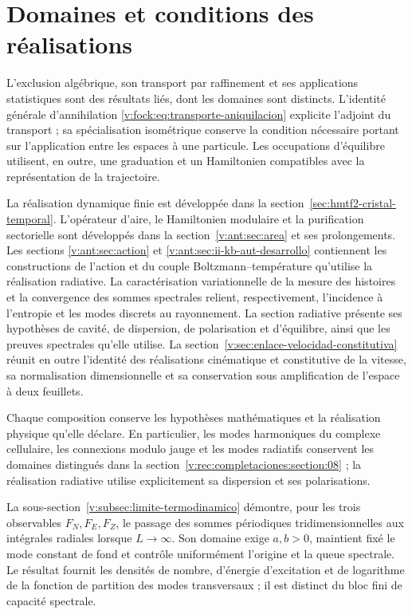 \section{Domaines et conditions des réalisations}
\label{v:integracion}
L’exclusion algébrique, son transport par raffinement et ses applications
statistiques sont des résultats liés, dont les domaines sont distincts.
L’identité générale d’annihilation
\eqref{v:fock:eq:transporte-aniquilacion} explicite l’adjoint du transport ;
sa spécialisation isométrique conserve la condition nécessaire portant sur
l’application entre les espaces à une particule. Les occupations
d’équilibre utilisent, en outre, une graduation et un Hamiltonien compatibles
avec la représentation de la trajectoire.

La réalisation dynamique finie est développée dans la
section~\ref{sec:hmtf2-cristal-temporal}. L’opérateur d’aire, le
Hamiltonien modulaire et la purification sectorielle sont développés dans la
section~\ref{v:ant:sec:area} et ses prolongements. Les sections
\ref{v:ant:sec:action} et \ref{v:ant:sec:ii-kb-aut-desarrollo} contiennent
les constructions de l’action et du couple Boltzmann--température qu’utilise
la réalisation radiative. La caractérisation variationnelle de la
mesure des histoires et la convergence des sommes spectrales relient,
respectivement, l’incidence à l’entropie et les modes discrets au rayonnement.
La section radiative
présente ses hypothèses de cavité,
de dispersion, de polarisation et d’équilibre, ainsi que les preuves spectrales
qu’elle utilise. La section~\ref{v:sec:enlace-velocidad-constitutiva}
réunit en outre l’identité des réalisations cinématique et constitutive
de la vitesse, sa normalisation dimensionnelle et sa conservation sous
amplification de l’espace à deux feuillets.

Chaque composition conserve les hypothèses mathématiques et la réalisation
physique qu’elle déclare. En particulier, les modes harmoniques du complexe
cellulaire, les connexions modulo jauge et les modes radiatifs conservent
les domaines distingués dans la
section~\ref{v:rec:completaciones:section:08} ; la réalisation radiative
utilise explicitement sa dispersion et ses polarisations.

La sous-section~\ref{v:subsec:limite-termodinamico} démontre, pour les trois
observables \(F_N,F_E,F_Z\), le passage des sommes périodiques tridimensionnelles
aux intégrales radiales lorsque \(L\to\infty\). Son domaine exige \(a,b>0\),
maintient fixé le mode constant de fond et contrôle uniformément l’origine
et la queue spectrale. Le résultat fournit les densités de nombre,
d’énergie d’excitation et de logarithme de la fonction de partition des modes
transversaux ; il est distinct du bloc fini de capacité spectrale.

